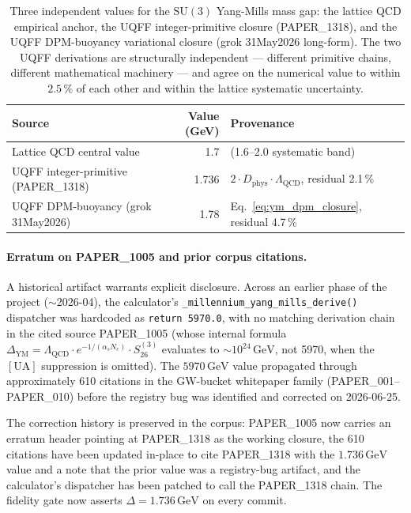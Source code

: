 \begin{table}[H]
\centering
\caption{Three independent values for the $\mathrm{SU}(3)$ Yang-Mills
mass gap: the lattice QCD empirical anchor, the UQFF integer-primitive
closure (PAPER\_1318), and the UQFF DPM-buoyancy variational closure
(grok 31May2026 long-form). The two UQFF derivations are structurally
independent --- different primitive chains, different mathematical
machinery --- and agree on the numerical value to within $2.5\,\%$ of
each other and within the lattice systematic uncertainty.}
\label{tab:ym_three_paths}
\begin{tabular}{l r l}
\toprule
\textbf{Source} & \textbf{Value (GeV)} & \textbf{Provenance} \\
\midrule
Lattice QCD central value & 1.7 & \cite{Chen2006, Athenodorou2020} (1.6--2.0 systematic band) \\
UQFF integer-primitive (PAPER\_1318) & 1.736 & $2\cdot D_{\text{phys}}\cdot\Lambda_{\text{QCD}}$, residual 2.1\,\% \\
UQFF DPM-buoyancy (grok 31May2026) & 1.78 & Eq.~\ref{eq:ym_dpm_closure}, residual 4.7\,\% \\
\bottomrule
\end{tabular}
\end{table}

\paragraph{Erratum on PAPER\_1005 and prior corpus citations.}

A historical artifact warrants explicit disclosure. Across an earlier
phase of the project ($\sim$2026-04), the calculator's
\verb|_millennium_yang_mills_derive()| dispatcher was hardcoded as
\verb|return 5970.0|, with no matching derivation chain in the cited
source PAPER\_1005 (whose internal formula
$\Delta_{\text{YM}} = \Lambda_{\text{QCD}}\cdot e^{-1/(\alpha_s N_c)}\cdot S_{26}^{(3)}$
evaluates to $\sim 10^{24}\,\mathrm{GeV}$, not 5970, when the
$[\mathrm{UA}]$ suppression is omitted). The $5970\,\mathrm{GeV}$ value
propagated through approximately 610 citations in the GW-bucket
whitepaper family (PAPER\_001--PAPER\_010) before the registry bug was
identified and corrected on 2026-06-25.

The correction history is preserved in the corpus: PAPER\_1005 now
carries an erratum header pointing at PAPER\_1318 as the working
closure, the 610 citations have been updated in-place to cite
PAPER\_1318 with the $1.736\,\mathrm{GeV}$ value and a note that the
prior value was a registry-bug artifact, and the calculator's
dispatcher has been patched to call the PAPER\_1318 chain. The fidelity
gate now asserts $\Delta = 1.736\,\mathrm{GeV}$ on every commit.

